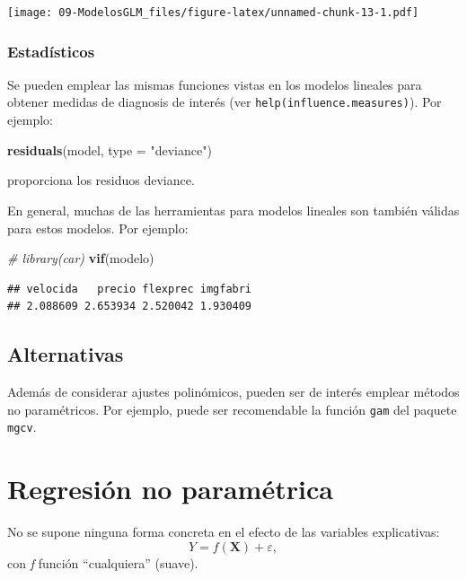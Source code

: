 \documentclass[]{book}
\newenvironment{Shaded}{\begin{snugshade}}{\end{snugshade}}
\newcommand{\CommentTok}[1]{\textcolor[rgb]{0.56,0.35,0.01}{\textit{#1}}}
\newcommand{\DataTypeTok}[1]{\textcolor[rgb]{0.13,0.29,0.53}{#1}}
\newcommand{\KeywordTok}[1]{\textcolor[rgb]{0.13,0.29,0.53}{\textbf{#1}}}
\newcommand{\NormalTok}[1]{#1}
\newcommand{\StringTok}[1]{\textcolor[rgb]{0.31,0.60,0.02}{#1}}
\begin{document}
\texttt{[image: 09-ModelosGLM\_files/figure-latex/unnamed-chunk-13-1.pdf]}

\hypertarget{estadisticos-1}{%
\subsection{Estadísticos}\label{estadisticos-1}}

Se pueden emplear las mismas funciones vistas en los modelos lineales para obtener medidas de diagnosis de interés (ver \texttt{help(influence.measures)}). Por ejemplo:

\begin{Shaded}
\begin{Highlighting}[]
\KeywordTok{residuals}\NormalTok{(model, }\DataTypeTok{type =} \StringTok{"deviance"}\NormalTok{) }
\end{Highlighting}
\end{Shaded}

proporciona los residuos deviance.

En general, muchas de las herramientas para modelos lineales son también válidas para estos modelos. Por ejemplo:

\begin{Shaded}
\begin{Highlighting}[]
\CommentTok{# library(car)}
\KeywordTok{vif}\NormalTok{(modelo)}
\end{Highlighting}
\end{Shaded}

\begin{verbatim}
## velocida   precio flexprec imgfabri 
## 2.088609 2.653934 2.520042 1.930409
\end{verbatim}

\hypertarget{alternativas-1}{%
\section{Alternativas}\label{alternativas-1}}

Además de considerar ajustes polinómicos, pueden ser de interés emplear métodos no paramétricos. Por ejemplo, puede ser recomendable la función \texttt{gam} del paquete \texttt{mgcv}.

\hypertarget{regresion-no-parametrica}{%
\chapter{Regresión no paramétrica}\label{regresion-no-parametrica}}

No se supone ninguna forma concreta en el efecto de las variables explicativas:
\[Y=f\left(  \mathbf{X}\right)  +\varepsilon,\]
con \emph{f} función ``cualquiera'' (suave).
\end{document}
